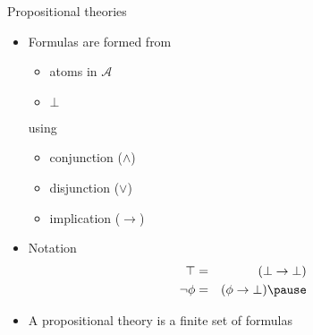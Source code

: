 \begin{frame}[c]{Propositional theories}

\begin{itemize}
\item Formulas are formed from
  \begin{itemize}
  \item atoms in $\mathcal{A}$
  \item $\bot$
  \end{itemize}
using
  \begin{itemize}
  \item conjunction ($\wedge$)
  \item disjunction ($\vee$)
  \item implication ($\rightarrow$)
  \end{itemize}
\item <2-> Notation
  \begin{eqnarray*}
    \top   &=& (\bot\rightarrow\bot)
    \\
    {\neg \phi} &=& (\phi   \rightarrow\bot)
  \pause
  \end{eqnarray*}
\item <3-> A \alert{propositional theory} is a finite set of formulas
\end{itemize}

\end{frame}
